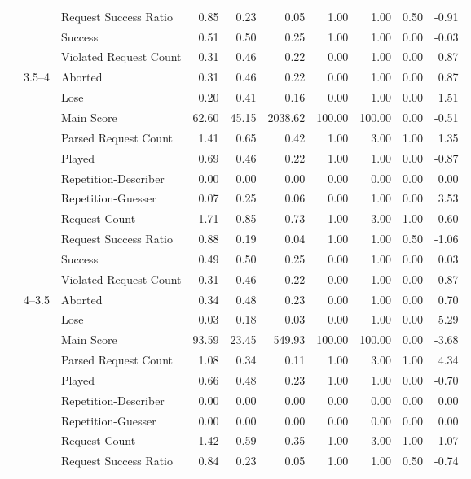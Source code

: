 \begin{tabular}{lllrrrrrrr}
 &  & Request Success Ratio & 0.85 & 0.23 & 0.05 & 1.00 & 1.00 & 0.50 & -0.91 \\
 &  & Success & 0.51 & 0.50 & 0.25 & 1.00 & 1.00 & 0.00 & -0.03 \\
 &  & Violated Request Count & 0.31 & 0.46 & 0.22 & 0.00 & 1.00 & 0.00 & 0.87 \\
\cline{2-10}
 & \multirow[t]{11}{*}{3.5--4} & Aborted & 0.31 & 0.46 & 0.22 & 0.00 & 1.00 & 0.00 & 0.87 \\
 &  & Lose & 0.20 & 0.41 & 0.16 & 0.00 & 1.00 & 0.00 & 1.51 \\
 &  & Main Score & 62.60 & 45.15 & 2038.62 & 100.00 & 100.00 & 0.00 & -0.51 \\
 &  & Parsed Request Count & 1.41 & 0.65 & 0.42 & 1.00 & 3.00 & 1.00 & 1.35 \\
 &  & Played & 0.69 & 0.46 & 0.22 & 1.00 & 1.00 & 0.00 & -0.87 \\
 &  & Repetition-Describer & 0.00 & 0.00 & 0.00 & 0.00 & 0.00 & 0.00 & 0.00 \\
 &  & Repetition-Guesser & 0.07 & 0.25 & 0.06 & 0.00 & 1.00 & 0.00 & 3.53 \\
 &  & Request Count & 1.71 & 0.85 & 0.73 & 1.00 & 3.00 & 1.00 & 0.60 \\
 &  & Request Success Ratio & 0.88 & 0.19 & 0.04 & 1.00 & 1.00 & 0.50 & -1.06 \\
 &  & Success & 0.49 & 0.50 & 0.25 & 0.00 & 1.00 & 0.00 & 0.03 \\
 &  & Violated Request Count & 0.31 & 0.46 & 0.22 & 0.00 & 1.00 & 0.00 & 0.87 \\
\cline{2-10}
 & \multirow[t]{11}{*}{4--3.5} & Aborted & 0.34 & 0.48 & 0.23 & 0.00 & 1.00 & 0.00 & 0.70 \\
 &  & Lose & 0.03 & 0.18 & 0.03 & 0.00 & 1.00 & 0.00 & 5.29 \\
 &  & Main Score & 93.59 & 23.45 & 549.93 & 100.00 & 100.00 & 0.00 & -3.68 \\
 &  & Parsed Request Count & 1.08 & 0.34 & 0.11 & 1.00 & 3.00 & 1.00 & 4.34 \\
 &  & Played & 0.66 & 0.48 & 0.23 & 1.00 & 1.00 & 0.00 & -0.70 \\
 &  & Repetition-Describer & 0.00 & 0.00 & 0.00 & 0.00 & 0.00 & 0.00 & 0.00 \\
 &  & Repetition-Guesser & 0.00 & 0.00 & 0.00 & 0.00 & 0.00 & 0.00 & 0.00 \\
 &  & Request Count & 1.42 & 0.59 & 0.35 & 1.00 & 3.00 & 1.00 & 1.07 \\
 &  & Request Success Ratio & 0.84 & 0.23 & 0.05 & 1.00 & 1.00 & 0.50 & -0.74 \\

\end{tabular}
